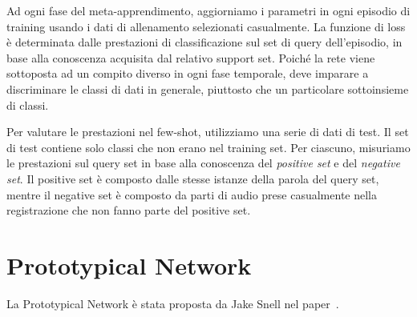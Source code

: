 \documentclass[12pt,a4paper,titlepage]{article}
\begin{document}
Ad ogni fase del meta-apprendimento, aggiorniamo i parametri in ogni episodio di training usando i dati di allenamento selezionati casualmente. La funzione di loss è determinata dalle prestazioni di classificazione sul set di query dell'episodio, in base alla conoscenza acquisita dal relativo support set. Poiché la rete viene sottoposta ad un compito diverso in ogni fase temporale, deve imparare a discriminare le classi di dati in generale, piuttosto che un particolare sottoinsieme di classi.

Per valutare le prestazioni nel few-shot, utilizziamo una serie di dati di test. Il set di test contiene solo classi  che non erano nel training set. Per ciascuno, misuriamo le prestazioni sul query set in base alla conoscenza del \textit{positive set} e del \textit{negative set}. Il positive set è composto dalle stesse istanze della parola del query set, mentre il negative set è composto da parti di audio prese casualmente nella registrazione che non fanno parte del positive set.
\clearpage


\section{Prototypical Network}
\label{sec:protonet}
La Prototypical Network è stata proposta da Jake Snell nel paper~\cite{snell:prototypical}.
\end{document}

